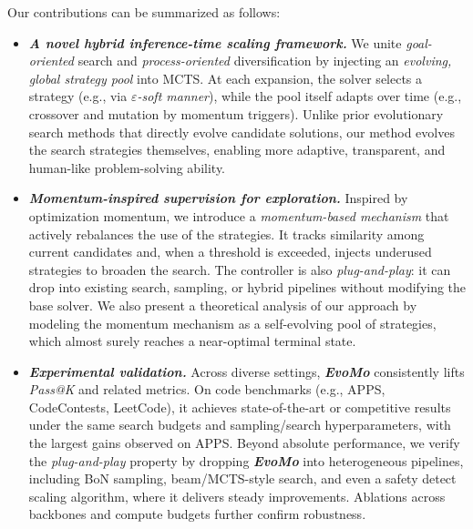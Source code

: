 \documentclass[11pt]{article}
\theoremstyle{definition}
\theoremstyle{remark}
\begin{document}
 


Our contributions can be summarized as follows:
\vspace{-0.7em}

\begin{itemize}[leftmargin=*,itemsep=-0.3em]

\item[\ding{72}] \textbf{\textit{A novel hybrid inference-time scaling framework.}}
We unite \textit{goal-oriented} search and \textit{process-oriented} diversification by injecting an \textit{evolving, global strategy pool} into MCTS. At each expansion, the solver selects a strategy (e.g., via \textit{$\varepsilon$-soft manner}), while the pool itself adapts over time (e.g., crossover and mutation by momentum triggers). Unlike prior evolutionary search methods that directly evolve candidate solutions, our method evolves the search strategies themselves, enabling more adaptive, transparent, and human-like problem-solving ability.


\vspace{0.3em}
\item[\ding{72}] \textbf{\textit{Momentum-inspired supervision for exploration.}} Inspired by optimization momentum, we introduce a \textit{momentum-based mechanism} that actively rebalances the use of the strategies. It tracks similarity among current candidates and, when a threshold is exceeded, injects underused strategies to broaden the search. The controller is also \textit{plug-and-play}: it can drop into existing search, sampling, or hybrid pipelines without modifying the base solver. We also present a theoretical analysis of our approach by modeling the momentum mechanism as a self-evolving pool of strategies, which almost surely reaches a near-optimal terminal state. 


\vspace{0.3em}
\item[\ding{72}] \textbf{\textit{Experimental validation.}}
Across diverse settings, \textbf{\textit{EvoMo}} consistently lifts \emph{Pass@K} and related metrics. On code benchmarks (e.g., APPS, CodeContests, LeetCode), it achieves state-of-the-art or competitive results under the same search budgets and sampling/search hyperparameters, with the largest gains observed on APPS. Beyond absolute performance, we verify the \emph{plug-and-play} property by dropping \textbf{\textit{EvoMo}} into heterogeneous pipelines, including BoN sampling, beam/MCTS-style search, and even a safety detect scaling algorithm, where it delivers steady improvements. Ablations across backbones and compute budgets further confirm robustness.

\end{itemize}
\vspace{-0.5em}
\end{document}
